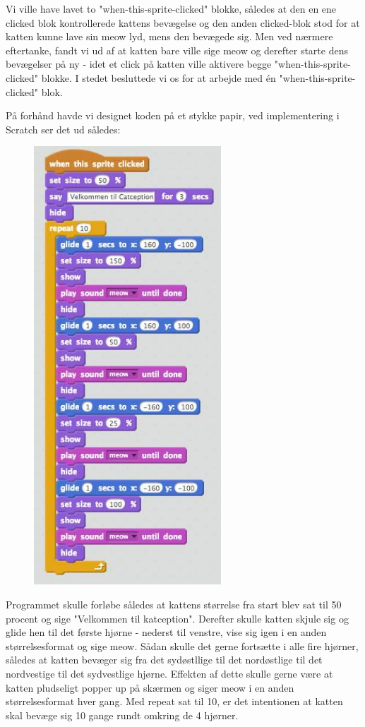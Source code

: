 \documentclass[12pt, a4paper, hidelinks]{article}
\begin{document}
\vspace{10mm}

Vi ville have lavet to "when-this-sprite-clicked" blokke, således at den en ene clicked blok kontrollerede kattens bevægelse og den anden clicked-blok stod for at katten kunne lave sin meow lyd, mens den bevægede sig. Men ved nærmere eftertanke, fandt vi ud af at katten bare ville sige meow og derefter starte dens bevægelser på ny - idet et click på katten ville aktivere begge "when-this-sprite-clicked" blokke.  
I stedet besluttede vi os for at arbejde med én "when-this-sprite-clicked" blok.

På forhånd havde vi designet koden på et stykke papir, ved implementering i Scratch ser det ud således:

\begin{figure}
  \begin{center}
    \includegraphics[width=70mm]{B1.png}
  \end{center}
  \caption{}
  \label{fig:B1}
\end{figure}

\FloatBarrier
Programmet skulle forløbe således at kattens størrelse fra start blev sat til 50 procent og sige "Velkommen til katception". Derefter skulle katten skjule sig og glide hen til det første hjørne - nederst til venstre, vise sig igen i en anden størrelsesformat og sige meow. Sådan skulle det gerne fortsætte i alle fire hjørner, således at katten bevæger sig fra det sydøstllige til det nordøstlige til det nordvestige til det sydvestlige hjørne. Effekten af dette skulle gerne være at katten pludseligt popper up på skærmen og siger meow i en anden størrelsesformat hver gang. Med repeat sat til 10, er det intentionen at katten skal bevæge sig 10 gange rundt omkring de 4 hjørner.
\end{document}
